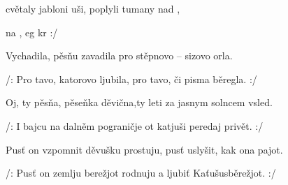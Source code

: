 


\zs


cvětaly jabloni uši, poplyli tumany nad ,

 na  ,  eg kr :/
\ks

\zs
Vychadila, pěsňu zavadila pro stěpnovo -- sizovo orla.

/: Pro tavo, katorovo ljubila, pro tavo, či pisma běregla. :/
\ks

\zs
Oj, ty pěsňa, pěseňka děvična,ty leti za jasnym solncem vsled.

/: I bajcu na dalněm pograničje ot katjuši peredaj privět. :/
\ks

\zs
Pusť on vzpomnit děvušku prostuju, pusť uslyšit, kak ona pajot.

/: Pusť on zemlju berežjot rodnuju a ljubiť Kaťušusběrežjot. :/
\ks

\kp



